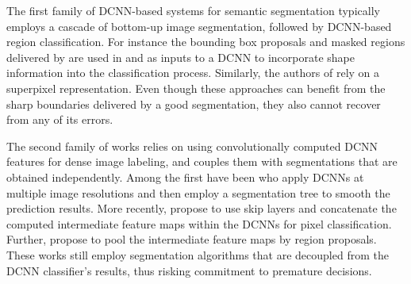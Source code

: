 \documentclass[10pt,journal,compsoc]{IEEEtran}
\begin{document}
The first family of DCNN-based systems for semantic segmentation typically employs a cascade of
bottom-up image segmentation, followed by DCNN-based region classification.
For instance the bounding box proposals and masked regions delivered by
\cite{arbelaez2014multiscale, Uijlings13} are used in \cite{girshick2014rcnn}
and \cite{hariharan2014simultaneous}  as inputs to a DCNN to incorporate shape
information into the classification process. Similarly, the authors of
 \cite{mostajabi2014feedforward} rely on a superpixel representation.
Even though these approaches can benefit from the sharp boundaries delivered by a  good segmentation,
they also cannot recover from any of its errors. 


The second family of works relies on using convolutionally computed DCNN
features for dense image labeling, and couples them with segmentations that are obtained independently.
Among the first have been
\cite{farabet2013learning} who apply DCNNs at multiple image resolutions and
then employ a segmentation tree to smooth the prediction results. More recently,
\cite{hariharan2014hypercolumns} propose to use skip layers and concatenate the computed
intermediate feature maps within the DCNNs for pixel classification. Further, \cite{dai2014convolutional}
propose to pool the intermediate feature maps by region proposals. These works
still employ segmentation algorithms that are decoupled from the DCNN
classifier's results, thus risking commitment to premature decisions. 
\end{document}
